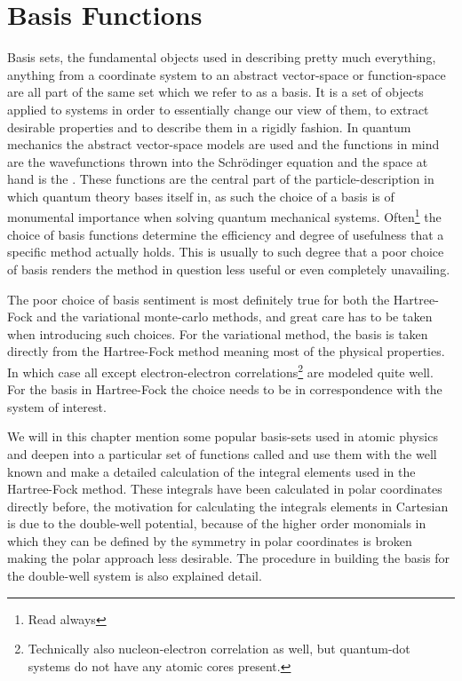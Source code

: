 \chapter{Basis Functions\label{chapter:3}}
    Basis sets, the fundamental objects used in describing pretty much
    everything, anything from a coordinate system to an abstract vector-space
    or function-space are all part of the same set which we refer to as a
    basis. It is a set of objects applied to systems in order to essentially
    change our view of them, to extract desirable properties and to describe
    them in a rigidly fashion. In quantum mechanics the abstract vector-space
    models are used and the functions in mind are the wavefunctions thrown into
    the Schrödinger equation and the space at hand is the .  These functions are the central part of the particle-description
    in which quantum theory bases itself in, as such the choice of a basis is
    of monumental importance when solving quantum mechanical systems.
    Often\footnote{Read always} the choice of basis functions determine the
    efficiency and degree of usefulness that a specific method actually holds.
    This is usually to such degree that a poor choice of basis renders the
    method in question less useful or even completely unavailing.

    The poor choice of basis sentiment is most definitely true for both the
    Hartree-Fock and the variational monte-carlo methods, and great care has to
    be taken when introducing such choices. For the variational method, the
    basis is taken directly from the Hartree-Fock method meaning most of the
    physical properties. In which case all except electron-electron
    correlations\footnote{Technically also nucleon-electron correlation as
    well, but quantum-dot systems do not have any atomic cores present.} are
    modeled quite well. For the basis in Hartree-Fock the choice needs to be in
    correspondence with the system of interest.

    We will in this chapter mention some popular basis-sets used in atomic
    physics and deepen into a particular set of functions called
     and use them with the well known
     and make a detailed calculation of the integral
    elements used in the Hartree-Fock method. These integrals have been
    calculated in polar coordinates directly before\cite{anisimovas}, the
    motivation for calculating the integrals elements in Cartesian is due to
    the double-well potential, because of the higher order monomials in which
    they can be defined by the symmetry in polar coordinates is broken making
    the polar approach less desirable. The procedure in building the basis for
    the double-well system is also explained detail.

